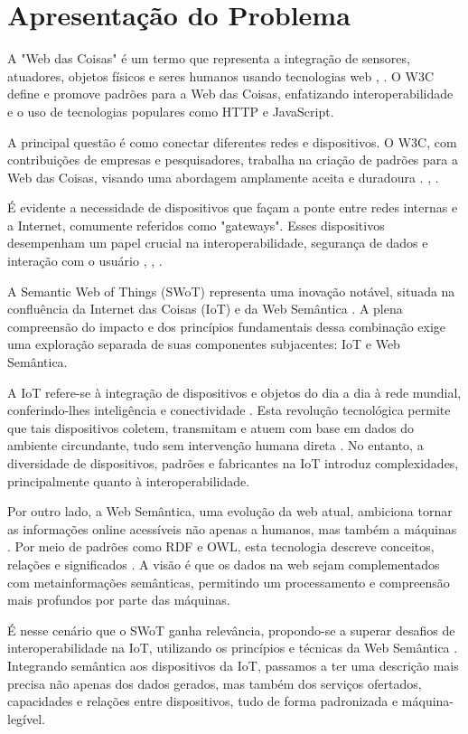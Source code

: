 \chapter{Apresentação do Problema}

A "Web das Coisas" é um termo que representa a integração de sensores, atuadores, objetos físicos e seres humanos usando tecnologias web  \cite{WoTTerminology}, \cite{WoTCommunityWiki}. O W3C define e promove padrões para a Web das Coisas, enfatizando interoperabilidade e o uso de tecnologias populares como HTTP e JavaScript.

A principal questão é como conectar diferentes redes e dispositivos. O W3C, com contribuições de empresas e pesquisadores, trabalha na criação de padrões para a Web das Coisas, visando uma abordagem amplamente aceita e duradoura \cite{Stirbu2008} \cite{Gyrard2017}. \cite{GARCIAMANGAS2019235}, \cite{OpenApíWoT2021}.

É evidente a necessidade de dispositivos que façam a ponte entre redes internas e a Internet, comumente referidos como "gateways". Esses dispositivos desempenham um papel crucial na interoperabilidade, segurança de dados e interação com o usuário \cite{Stirbu2008}, \cite{Gyrard2017}, \cite{GARCIAMANGAS2019235}.

A Semantic Web of Things (SWoT) representa uma inovação notável, situada na confluência da Internet das Coisas (IoT) e da Web Semântica \cite{ssw1}. A plena compreensão do impacto e dos princípios fundamentais dessa combinação exige uma exploração separada de suas componentes subjacentes: IoT e Web Semântica.

A IoT refere-se à integração de dispositivos e objetos do dia a dia à rede mundial, conferindo-lhes inteligência e conectividade \cite{ssw2}. Esta revolução tecnológica permite que tais dispositivos coletem, transmitam e atuem com base em dados do ambiente circundante, tudo sem intervenção humana direta \cite{ssw3}. No entanto, a diversidade de dispositivos, padrões e fabricantes na IoT introduz complexidades, principalmente quanto à interoperabilidade.

Por outro lado, a Web Semântica, uma evolução da web atual, ambiciona tornar as informações online acessíveis não apenas a humanos, mas também a máquinas \cite{ssw4}. Por meio de padrões como RDF e OWL, esta tecnologia descreve conceitos, relações e significados \cite{ssw5}. A visão é que os dados na web sejam complementados com metainformações semânticas, permitindo um processamento e compreensão mais profundos por parte das máquinas.

É nesse cenário que o SWoT ganha relevância, propondo-se a superar desafios de interoperabilidade na IoT, utilizando os princípios e técnicas da Web Semântica \cite{ssw6}. Integrando semântica aos dispositivos da IoT, passamos a ter uma descrição mais precisa não apenas dos dados gerados, mas também dos serviços ofertados, capacidades e relações entre dispositivos, tudo de forma padronizada e máquina-legível.

